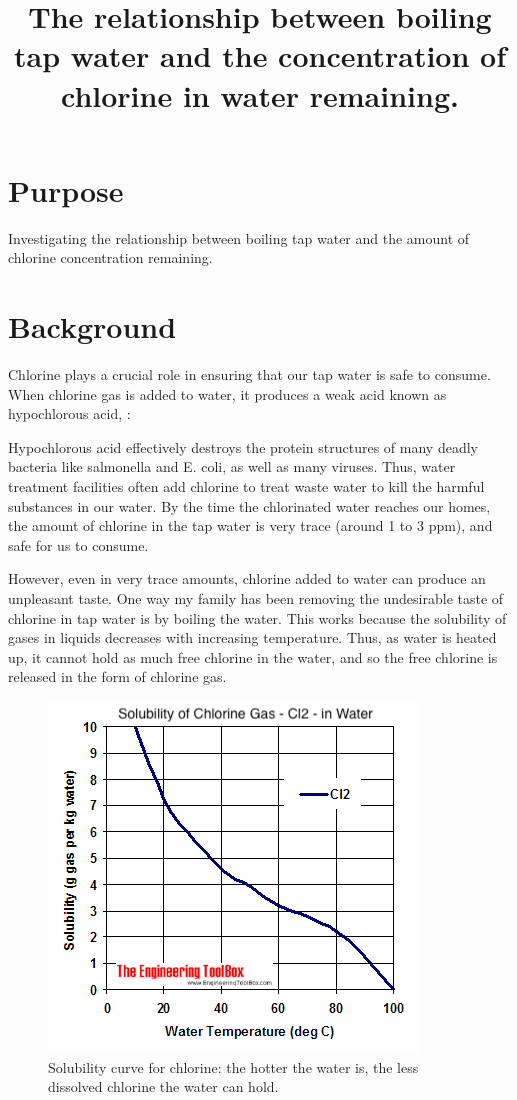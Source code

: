 \documentclass[11pt]{article}
\title{The relationship between boiling tap water and the concentration of chlorine in water remaining.}
\begin{document}
\section{Purpose}
Investigating the relationship between boiling tap water and the amount of chlorine concentration remaining.

\section{Background}

Chlorine plays a crucial role in ensuring that our tap water is safe to consume. When chlorine gas is added to water, it produces a weak acid known as hypochlorous acid, :

\centerline{}

Hypochlorous acid effectively destroys the protein structures of many deadly bacteria like salmonella and E. coli, as well as many viruses. Thus, water treatment facilities often add chlorine to treat waste water to kill the harmful substances in our water. By the time the chlorinated water reaches our homes, the amount of chlorine in the tap water is very trace (around 1 to 3 ppm), and safe for us to consume.

However, even in very trace amounts, chlorine added to water can produce an unpleasant taste. One way my family has been removing the undesirable taste of chlorine in tap water is by boiling the water. This works because the solubility of gases in liquids decreases with increasing temperature. Thus, as water is heated up, it cannot hold as much free chlorine in the water, and so the free chlorine is released in the form of chlorine gas.

\begin{figure}[H]
	\centering
	\caption{Solubility curve for chlorine: the hotter the water is, the less dissolved chlorine the water can hold.}
	\includegraphics{assets/cl-solubility.png}
\end{figure}
\end{document}
